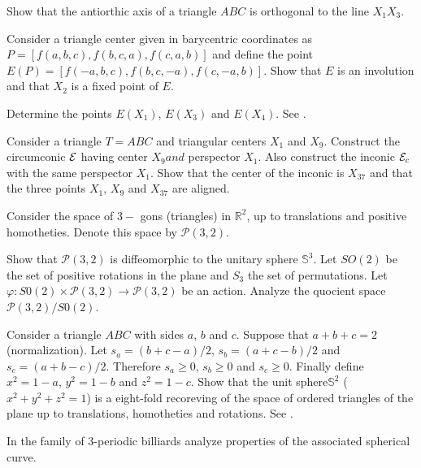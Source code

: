 \begin{exercise} Show that the
 antiorthic axis of a triangle $ABC$ is orthogonal to the line $X_1X_3$.
\end{exercise}

\begin{exercise} Consider a triangle center given in  barycentric coordinates as $P=[f(a,b,c),f(b,c,a), f(c,a,b)]$ and define the point $E(P)=[f(-a,b,c),f(b,c,-a), f(c, -a,b)]$. 
Show that $E $ is an involution   and   that $X_2$ is a fixed point of $E$. 

Determine the points $E(X_1)$, $E(X_3)$ and $E(X_4)$. See \cite{etc}.
 
 
\end{exercise}

\begin{exercise}
Consider a triangle $T=ABC$ and triangular centers $X_1$ and $X_9$.
Construct the circumconic $\mathcal{E}$ having center $X_9 and $    perspector   $X_1$. Also construct the inconic $\mathcal{E}_c$ with the same perspector $X_1$. Show that the center of the inconic is $X_{37}$ and that the three points $X_1$, $X_9$ and $X_{37}$ are aligned. 
\end{exercise}

\begin{exercise}
Consider the space of $3-$ gons (triangles) in $\mathbb{R}^2$, up to translations and positive homotheties. Denote this space by $\mathcal{P}(3,2).$

Show that $\mathcal{P}(3,2)$ is diffeomorphic to the unitary sphere $\mathbb{S}^3$.
Let $SO(2)$ be the set of positive  rotations in the plane and $S_3$ the set of permutations.
Let $\varphi:   S0(2) \times \mathcal{P}(3,2) \to \mathcal{P}(3,2)$ be an action. 
Analyze the quocient space $\mathcal{P}(3,2)/ S0(2)$.
\label{exe:appA-sphereS3}
\end{exercise}

\begin{exercise}
Consider a triangle $ABC$ with sides $a$, $b$ and $c$. Suppose that $a+b+c=2$ (normalization).
Let $s_a=(b+c-a)/2$, $s_b=(a+c-b)/2$ and $s_c=(a+b-c)/2$. Therefore $s_a\geq 0$, $s_b\geq 0$ and $s_c\geq 0$.
Finally define $x^2=1-a$, $y^2=1-b$ and $z^2=1-c$.
Show that the unit sphere$\mathbb{S}^2$  ($x^2+y^2+z^2=1$)  is a eight-fold recoreving of the space of ordered triangles of the plane up to translations, homotheties and rotations. See \cite{clayton-2019}.

In the family of 3-periodic billiards analyze properties of the associated  spherical curve. 
\end{exercise}